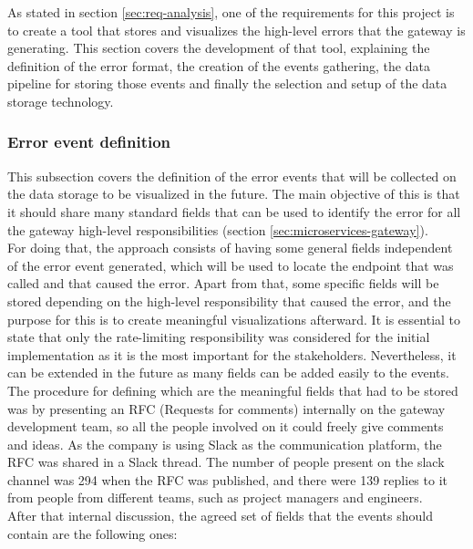 \documentclass[english, 12pt, a4paper, sci, utf8, a-1b, online]{aaltothesis}
\begin{document}
As stated in section \ref{sec:req-analysis}, one of the requirements for this project is to create a tool that stores and visualizes the high-level errors that the gateway is generating. This section covers the development of that tool, explaining the definition of the error format, the creation of the events gathering, the data pipeline for storing those events and finally the selection and setup of the data storage technology.

\subsubsection{Error event definition}
\label{sec:error-event-definition}

This subsection covers the definition of the error events that will be collected on the data storage to be visualized in the future. The main objective of this is that it should share many standard fields that can be used to identify the error for all the gateway high-level responsibilities (section \ref{sec:microservices-gateway}).\\

For doing that, the approach consists of having some general fields independent of the error event generated, which will be used to locate the endpoint that was called and that caused the error. Apart from that, some specific fields will be stored depending on the high-level responsibility that caused the error, and the purpose for this is to create meaningful visualizations afterward. It is essential to state that only the rate-limiting responsibility was considered for the initial implementation as it is the most important for the stakeholders. Nevertheless, it can be extended in the future as many fields can be added easily to the events.\\

The procedure for defining which are the meaningful fields that had to be stored was by presenting an RFC (Requests for comments) \cite{reynolds1987request} internally on the gateway development team, so all the people involved on it could freely give comments and ideas. As the company is using Slack as the communication platform, the RFC was shared in a Slack thread. The number of people present on the slack channel was 294 when the RFC was published, and there were 139 replies to it from people from different teams, such as project managers and engineers.\\

After that internal discussion, the agreed set of fields that the events should contain are the following ones:
\end{document}
